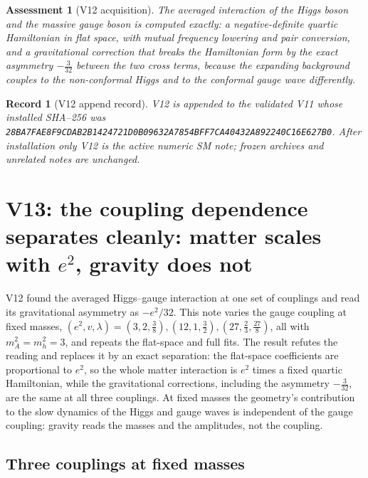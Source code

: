 \documentclass[11pt]{article}
\newtheorem{assessment}[theorem]{Assessment}
\newtheorem{record}[theorem]{Record}
\theoremstyle{remark}
\begin{document}
\begin{assessment}[V12 acquisition]
\label{ass:v20v12}
The averaged interaction of the Higgs boson and the massive gauge
boson is computed exactly: a negative-definite quartic Hamiltonian in
flat space, with mutual frequency lowering and pair conversion, and a
gravitational correction that breaks the Hamiltonian form by the
exact asymmetry \(-\tfrac3{32}\) between the two cross terms, because
the expanding background couples to the non-conformal Higgs and to
the conformal gauge wave differently.
\end{assessment}

\begin{record}[V12 append record]
\label{rec:v20v12}
V12 is appended to the validated V11 whose installed SHA--256 was
\texttt{28BA7FAE8F9CDAB2B1424721D0B09632A7854BFF7CA40432A892240C16E627B0}.
After installation only V12 is the active numeric SM note; frozen
archives and unrelated notes are unchanged.
\end{record}


\section{V13: the coupling dependence separates cleanly: matter scales with \texorpdfstring{$e^2$}{e2}, gravity does not}
\label{sec:v20v13}

V12 found the averaged Higgs--gauge interaction at one set of
couplings and read its gravitational asymmetry as \(-e^2/32\).  This
note varies the gauge coupling at fixed masses,
\((e^2,v,\lambda)=(3,2,\tfrac38),(12,1,\tfrac32),(27,\tfrac23,\tfrac{27}8)\),
all with \(m_A^2=m_h^2=3\), and repeats the flat-space and full
fits.  The result refutes the reading and replaces it by an exact
separation: the flat-space coefficients are proportional to \(e^2\),
so the whole matter interaction is \(e^2\) times a fixed quartic
Hamiltonian, while the gravitational corrections, including the
asymmetry \(-\tfrac3{32}\), are the same at all three couplings.  At
fixed masses the geometry's contribution to the slow dynamics of the
Higgs and gauge waves is independent of the gauge coupling: gravity
reads the masses and the amplitudes, not the coupling.

\subsection{Three couplings at fixed masses}
\end{document}
